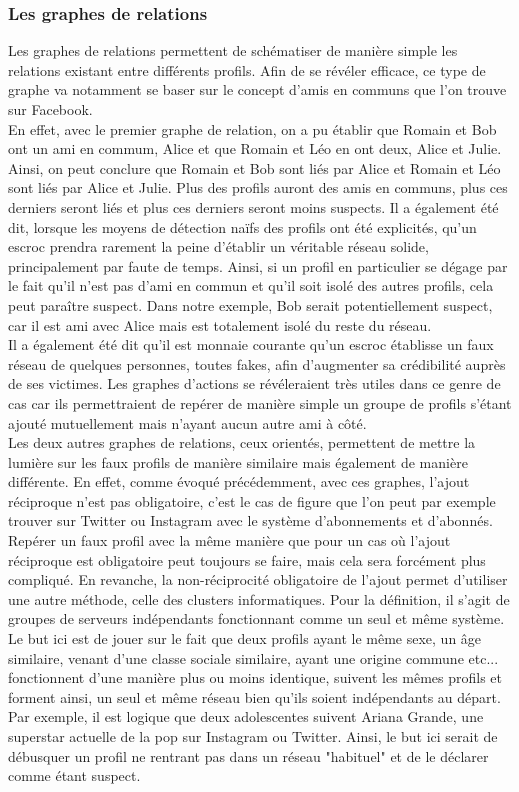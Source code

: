 \documentclass[12pt]{report}
\begin{document}
\subsubsection{Les graphes de relations}
Les graphes de relations permettent de schématiser de manière simple les relations existant entre différents profils. Afin de se révéler efficace, ce type de graphe va notamment se baser sur le concept d'amis en communs que l'on trouve sur Facebook.\\
En effet, avec le premier graphe de relation, on a pu établir que Romain et Bob ont un ami en commum, Alice et que Romain et Léo en ont deux, Alice et Julie. Ainsi, on peut conclure que Romain et Bob sont liés par Alice et Romain et Léo sont liés par Alice et Julie. Plus des profils auront des amis en communs, plus ces derniers seront liés et plus ces derniers seront moins suspects. Il a également été dit, lorsque les moyens de détection naïfs des profils ont été explicités, qu'un escroc prendra rarement la peine d'établir un véritable réseau solide, principalement par faute de temps. Ainsi, si un profil en particulier se dégage par le fait qu'il n'est pas d'ami en commun et qu'il soit isolé des autres profils, cela peut paraître suspect. Dans notre exemple, Bob serait potentiellement suspect, car il est ami avec Alice mais est totalement isolé du reste du réseau. \\
Il a également été dit qu'il est monnaie courante qu'un escroc établisse un faux réseau de quelques personnes, toutes fakes, afin d'augmenter sa crédibilité auprès de ses victimes. Les graphes d'actions se révéleraient très utiles dans ce genre de cas car ils permettraient de repérer de manière simple un groupe de profils s'étant ajouté mutuellement mais n'ayant aucun autre ami à côté. \\

Les deux autres graphes de relations, ceux orientés, permettent de mettre la lumière sur les faux profils de manière similaire mais également de manière différente. En effet, comme évoqué précédemment, avec ces graphes, l'ajout réciproque n'est pas obligatoire, c'est le cas de figure que l'on peut par exemple trouver sur Twitter ou Instagram avec le système d'abonnements et d'abonnés. Repérer un faux profil avec la même manière que pour un cas où l'ajout réciproque est obligatoire peut toujours se faire, mais cela sera forcément plus compliqué. En revanche, la non-réciprocité obligatoire de l'ajout permet d'utiliser une autre méthode, celle des clusters informatiques. Pour la définition, il s'agit de groupes de serveurs indépendants fonctionnant comme un seul et même système. Le but ici est de jouer sur le fait que deux profils ayant le même sexe, un âge similaire, venant d'une classe sociale similaire, ayant une origine commune etc... fonctionnent d'une manière plus ou moins identique, suivent les mêmes profils et forment ainsi, un seul et même réseau bien qu'ils soient indépendants au départ. Par exemple, il est logique que deux adolescentes suivent Ariana Grande, une superstar actuelle de la pop sur Instagram ou Twitter. Ainsi, le but ici serait de débusquer un profil ne rentrant pas dans un réseau "habituel" et de le déclarer comme étant suspect. 
\end{document}
